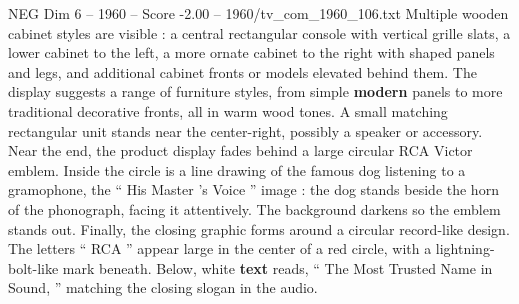 \begin{textsample}{NEG Dim 6 – 1960 – Score -2.00 – 1960/tv\_com\_1960\_106.txt}
Multiple wooden cabinet styles are visible : a central rectangular console with vertical grille slats, a lower cabinet to the left, a more ornate cabinet to the right with shaped panels and legs, and additional cabinet fronts or models elevated behind them.
The display suggests a range of furniture styles, from simple \textbf{modern} panels to more traditional decorative fronts, all in warm wood tones.
A small matching rectangular unit stands near the center-right, possibly a speaker or accessory.
Near the end, the product display fades behind a large circular RCA Victor emblem.
Inside the circle is a line drawing of the famous dog listening to a gramophone, the “ His Master ’s Voice ” image : the dog stands beside the horn of the phonograph, facing it attentively.
The background darkens so the emblem stands out.
Finally, the closing graphic forms around a circular record-like design.
The letters “ RCA ” appear large in the center of a red circle, with a lightning-bolt-like mark beneath.
Below, white \textbf{text} reads, “ The Most Trusted Name in Sound, ” matching the closing slogan in the audio.

\end{textsample}
